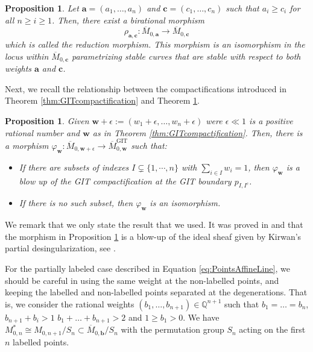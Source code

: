 \documentclass[12pt, letterpaper]{amsart}
\theoremstyle{plain}
\newtheorem{proposition}[theorem]{Proposition}
\theoremstyle{definition}
\begin{document}
\begin{proposition}
\label{thm:Hassett}
\cite{hassett2003moduli}
Let 
$\mathbf{a}=(a_1, \ldots, a_n)$ and $\mathbf{c}=(c_1, \ldots, c_n)$ such that $a_i \geq c_i$ for all $n \geq i \geq 1$.  Then, there exist a birational morphism 
$$
\rho_{\mathbf{a},\mathbf{c}}: 
\overline{M}_{0, \mathbf{a}} \longrightarrow
\overline{M}_{0, \mathbf{c}}
$$
which is called the reduction morphism. This morphism is an isomorphism in the locus within $\overline{M}_{0, \mathbf{c}}$
 parametrizing stable curves that are stable with respect to both weights $\mathbf{a}$ and $\mathbf{c}$.
\end{proposition}
Next, we recall the relationship between the compactifications introduced in Theorem \ref{thm:GITcompactification} and Theorem \ref{thm:Hassett}.
\begin{proposition}
\label{prop:KSBAtoGIT}
\cite[Sec 8]{hassett2003moduli}
Given $\mathbf{w} + \epsilon:=(w_1 + \epsilon, \ldots, w_n+ \epsilon)$ were $\epsilon \ll 1$ is a positive rational number and $\mathbf{w}$ as in Theorem \ref{thm:GITcompactification}.
Then, there is a morphism 
$ \varphi_{\mathbf{w}}:
\overline{M}_{0, \mathbf{w} + \epsilon}
\longrightarrow \overline{M}_{0, 
\mathbf{ w}}^{\mathrm{GIT}}$
such that: 
\begin{itemize}
    \item[1.] If there are subsets of indexes $I \subsetneq \{1, \cdots, n\}$ with $\sum_{i\in I} w_i = 1$, then $\varphi_{\mathbf{w}}$ is a blow up of the GIT compactification at the GIT boundary $p_{I,I^{c}}$. 
    \item[2.] If there is no such subset, then $\varphi_{\mathbf{w}}$ is an isomorphism. 
\end{itemize}
\end{proposition}
We remark that we only state the result that we used. It was proved in \cite{young2011moduli} and  \cite{Moon2011} that the morphism in Proposition \ref{prop:KSBAtoGIT} is a  blow-up 
of the ideal sheaf given by
Kirwan’s partial desingularization, see
\cite{kirwan1985partial}.

For the partially labeled case described in Equation \eqref{eq:PointsAffineLine},
we should be careful in using the same weight at the non-labelled points, and keeping the labelled and non-labelled points separated at the degenerations. That is, we consider the rational weights $(b_1, \ldots, b_{n+1}) \in \mathbb{Q}^{n+1}$ such that
$b_1 = \ldots = b_n$,  $b_{n+1} + b_{i} > 1$
$b_1 + \ldots +b_{n+1} > 2$ and 
$1 \geq b_1 > 0$. We have 
$M_{0,n}^* \cong M_{0,n+1}/S_n \subset \overline{M}_{0,\mathbf{b}}/S_n$
with the permutation group $S_n$ acting on the first $n$ labelled points.  
\end{document}
